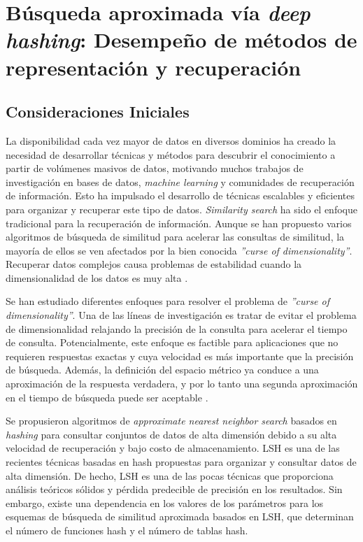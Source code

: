 
\chapter{Búsqueda aproximada vía \textit{deep hashing}: Desempeño de métodos de representación y recuperación}

\section{Consideraciones Iniciales}
 
La disponibilidad cada vez mayor de datos en diversos dominios ha creado la necesidad de desarrollar técnicas y métodos para descubrir el conocimiento a partir de volúmenes masivos de datos, motivando muchos trabajos de investigación en bases de datos, \textit{machine learning} y comunidades de recuperación de información. Esto ha impulsado el desarrollo de técnicas escalables y eficientes para organizar y recuperar este tipo de datos. \textit{Similarity search} ha sido el enfoque tradicional para la recuperación de información. Aunque se han propuesto varios algoritmos de búsqueda de similitud para acelerar las consultas de similitud, la mayoría de ellos se ven afectados por la bien conocida \textit{''curse of dimensionality''}. Recuperar datos complejos causa problemas de estabilidad cuando la dimensionalidad de los datos es muy alta \cite{aleman_high_dimensional} .


Se han estudiado diferentes enfoques para resolver el problema de \textit{''curse of dimensionality''}. Una de las líneas de investigación es tratar de evitar el problema de dimensionalidad relajando la precisión de la consulta para acelerar el tiempo de consulta. Potencialmente, este enfoque es factible para aplicaciones que no requieren respuestas exactas y cuya velocidad es más importante que la precisión de búsqueda. Además, la definición del espacio métrico ya conduce a una aproximación de la respuesta verdadera, y por lo tanto una segunda aproximación en el tiempo de búsqueda puede ser aceptable \cite{cit:avez99searching}.

Se propusieron algoritmos de \textit{approximate nearest neighbor search} basados en \textit{hashing} para consultar conjuntos de datos de alta dimensión debido a su alta velocidad de recuperación y bajo costo de almacenamiento. \acf{LSH} \cite{lsh} es una de las recientes técnicas basadas en hash propuestas para organizar y consultar datos de alta dimensión. De hecho, LSH es una de las pocas técnicas que proporciona análisis teóricos sólidos y pérdida predecible de precisión en los resultados. Sin embargo, existe una dependencia en los valores de los parámetros para los esquemas de búsqueda de similitud aproximada basados en LSH, que determinan el número de funciones hash y el número de tablas hash.

